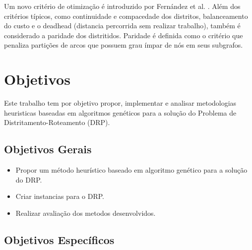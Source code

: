 \documentclass[12pt]{elsarticle}
\begin{document}
    
    Um novo critério de otimização é introduzido por Fernández et al. \cite{fernandez}. Além dos critérios típicos, como continuidade e compacedade dos distritos, balanceamento do custo e o deadhead (distancia percorrida sem realizar trabalho), também é considerado a paridade dos distritidos. Paridade é definida como o critério que penaliza partições de arcos que possuem grau ímpar de nós em seus subgrafos.


	\section{Objetivos}  \label{sec:objetivos}
	
    Este trabalho tem por objetivo propor, implementar e analisar metodologias heuristicas baseadas em algoritmos genéticos para a solução do Problema de Distritamento-Roteamento (DRP).
    
	\subsection{Objetivos Gerais} \label{sec:objetivosGerais}
    
    \begin{itemize}
    
    \item Propor um método heurístico baseado em algoritmo genético para a solução do DRP.
    \item Criar instancias para o DRP.
    \item Realizar avaliação dos metodos desenvolvidos.
    
    \end{itemize}
    
    
	
	\subsection{Objetivos Específicos} \label{sec:objetivosEspecificos}
    
\end{document}
